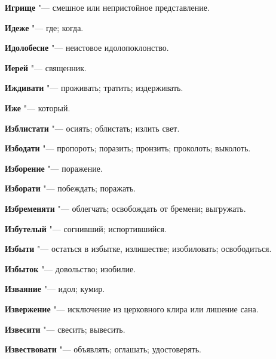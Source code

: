 \begin{mymulticols}{2}
\noindent\textbf{Игрище} "--- смешное или непристойное представление. 




\noindent\textbf{Идеже} "--- где; когда. 




\noindent\textbf{Идолобесие} "--- неистовое идолопоклонство. 




\noindent\textbf{Иерей} "--- священник. 




\noindent\textbf{Иждивати} "--- проживать; тратить; издерживать. 




\noindent\textbf{Иже} "--- который. 




\noindent\textbf{Изблистати} "--- осиять; облистать; излить свет. 




\noindent\textbf{Избодати} "--- пропороть; поразить; пронзить; проколоть; выколоть. 




\noindent\textbf{Изборение} "--- поражение. 




\noindent\textbf{Изборати} "--- побеждать; поражать. 




\noindent\textbf{Избременяти} "--- облегчать; освобождать от бремени; выгружать. 




\noindent\textbf{Избутелый} "--- согнивший; испортившийся. 




\noindent\textbf{Избыти} "--- остаться в избытке, излишестве; изобиловать; освободиться. 




\noindent\textbf{Избыток} "--- довольство; изобилие. 




\noindent\textbf{Изваяние} "--- идол; кумир. 




\noindent\textbf{Извержение} "--- исключение из церковного клира или лишение сана. 




\noindent\textbf{Извесити} "--- свесить; вывесить. 




\noindent\textbf{Извествовати} "--- объявлять; оглашать; удостоверять. 





\end{mymulticols}
